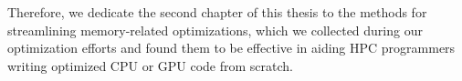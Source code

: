 Therefore, we dedicate the second chapter of this thesis to the methods for streamlining memory-related optimizations, which we collected during our optimization efforts and found them to be effective in aiding HPC programmers writing optimized CPU or GPU code from scratch.















